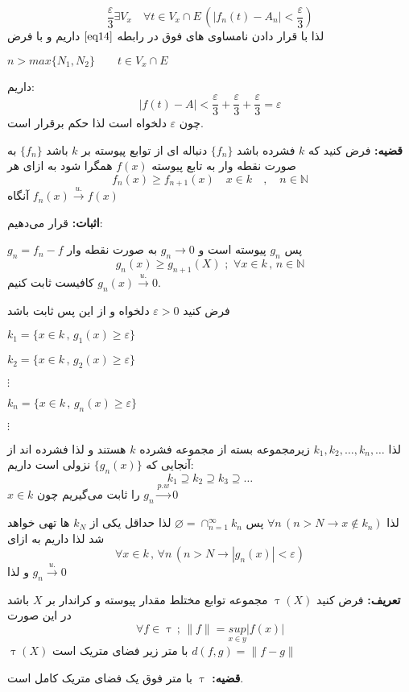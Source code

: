 \documentclass[12pt]{report}
\begin{document}
\[
\frac{\varepsilon}{3} \exists V_x \quad \forall t \in V_x \cap E\, (|f_n(t) - A_n| <\frac{\varepsilon}{3} )
\]
لذا با قرار دادن نامساوی های فوق در رابطه 
$\eqref{eq14}$
داریم و با فرض

$ n > max\{N_1 , N_2\} \qquad t \in V_x \cap E$

داریم:
\[
|f(t) - A| < \frac{\varepsilon}{3} + \frac{\varepsilon}{3} + \frac{\varepsilon}{3} = \varepsilon
\]
چون 
$\varepsilon$
دلخواه است لذا حکم برقرار است.

\textbf{قضیه:}
فرض کنید که
$k$
فشرده باشد
$\{f_n\}$
دنباله ای از توابع پیوسته بر 
$k$
باشد 
$\{f_n\}$
به صورت نقطه وار به تابع پیوسته 
$f(x)$
همگرا شود به ازای هر
\[
 f_n(x) \geq f_{n + 1}(x) \quad x \in k \quad, \quad n \in \mathbb{N}
\]
آنگاه 
$f_n(x)  \overset{u.}{\rightarrow} f(x)$

\textbf{اثبات:}
قرار می‌دهیم:

$g_n = f_n - f$
پس 
$g_n$
پیوسته است و 
$g_n \to 0$
به صورت نقطه وار 
\[
g_n(x) \geq g_{n+1}(X)\,\, ;\,\, \forall x \in k \, ,\, n \in \mathbb{N}
\]
کافیست ثابت کنیم
$g_n(x)  \overset{u.}{\rightarrow} 0$.

فرض کنید
$\varepsilon > 0$
دلخواه و از این پس ثابت باشد
\begin{center}
$k_1 = \{x \in k \, , \, g_1(x) \geq \varepsilon\}$

$k_2 = \{x \in k \, , \, g_2(x) \geq \varepsilon\}$

$\vdots$ 

$k_n = \{x \in k \, , \, g_n(x) \geq \varepsilon\}$

$\vdots$ 
\end{center}
لذا
$k_1 , k_2 , \dots , k_n , \dots$
زیرمجموعه بسته از مجموعه فشرده 
$k$
هستند و لذا فشرده اند از آنجایی که 
$\{g_n(x)\}$
نزولی است داریم:
\[
k_1 \supseteq k_2 \supseteq k_3 \supseteq \dots 
\]
$x\in k$
را ثابت می‌گیریم چون
$g_n  \overset{p.w}{\to} 0$

لذا 
$\forall n \,(n > N \rightarrow x \notin k _n)$
پس
$ \varnothing = \cap_{n = 1}^{\infty} k_n$
لذا حداقل یکی از 
$k_N$
ها تهی خواهد شد لذا داریم به ازای 
\[
\forall x\in k \,, \, \forall n \,(n > N \rightarrow |g_n(x)| < \varepsilon)
\]
و لذا 
$g_n  \overset{u.}{\to} 0$

\textbf{تعریف:}
فرض کنید 
$\uptau(X)$
مجموعه توابع مختلط مقدار پیوسته و کراندار بر
$X$
باشد در این صورت
\[
\forall f \in \uptau \,;\, \lVert f \rVert = \underset{x \in y}{sup}|f(x)|
\]
$\uptau(X)$
با متر زیر فضای متریک است
$d(f, g) = \lVert f - g \rVert$

\textbf{قضیه:}
$\uptau$
با متر فوق یک فضای متریک کامل است.
\end{document}
